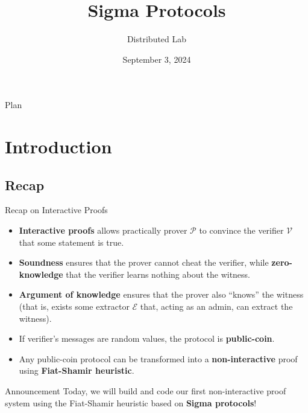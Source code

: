 \documentclass[xcolor={usenames,dvipsnames}]{beamer}
\title[Introduction to ZK]{\textbf{Sigma Protocols}}
\author{Distributed Lab}
\date{September 3, 2024}
\begin{document}
	\frame {
		\titlepage
	}
 
	\begin{frame}{Plan}
        \tableofcontents
    \end{frame}

	\section{Introduction}

    \subsection{Recap}
    \begin{frame}{Recap on Interactive Proofs}
        \begin{itemize}
            \item \textbf{Interactive proofs} allows practically prover $\mathcal{P}$ to convince the verifier $\mathcal{V}$ that some statement is true.\pause
            \item \textbf{Soundness} ensures that the prover cannot cheat the verifier, while \textbf{zero-knowledge} that the verifier learns nothing about the witness.\pause
            \item \textbf{Argument of knowledge} ensures that the prover also ``knows'' the witness (that is, exists some extractor $\mathcal{E}$ that, acting as an admin, can extract the witness).\pause
            \item If verifier's messages are random values, the protocol is \textbf{public-coin}.\pause
            \item Any public-coin protocol can be transformed into a \textbf{non-interactive} proof using \textbf{Fiat-Shamir heuristic}.\pause
        \end{itemize}

        \begin{alertblock}{Announcement}
            Today, we will build and code our first non-interactive proof system using the Fiat-Shamir heuristic based on \textbf{Sigma protocols}!
        \end{alertblock}
    \end{frame}
\end{document}

